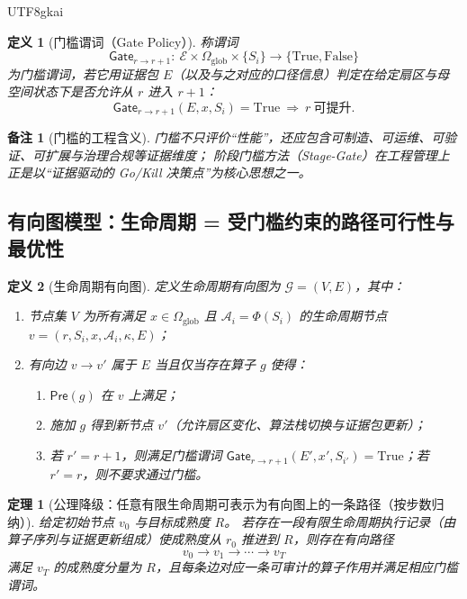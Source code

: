 \documentclass[12pt]{article}
\newtheorem{definition}{定义}[section]
\newtheorem{theorem}{定理}[section]
\newtheorem{remark}{备注}[section]
\begin{document}
\begin{CJK*}{UTF8}{gkai}
\begin{definition}[门槛谓词（Gate Policy）]
称谓词
\[
  \mathsf{Gate}_{r\to r+1}:\ \mathcal{E}\times \Omega_{\mathrm{glob}}\times \{S_i\}\to\{\text{True},\text{False}\}
\]
为门槛谓词，若它用证据包 $E$（以及与之对应的口径信息）判定在给定扇区与母空间状态下是否允许从 $r$ 进入 $r+1$：
\[
  \mathsf{Gate}_{r\to r+1}(E,x,S_i)=\text{True}\ \Rightarrow\ r\ \text{可提升}.
\]
\end{definition}

\begin{remark}[门槛的工程含义]
门槛不只评价“性能”，还应包含可制造、可运维、可验证、可扩展与治理合规等证据维度；
阶段门槛方法（\textsf{Stage-Gate}\cite{ref_stage_gate_dtl}）在工程管理上正是以“证据驱动的 Go/Kill 决策点”为核心思想之一。
\end{remark}

\subsection{有向图模型：生命周期 = 受门槛约束的路径可行性与最优性}
\label{sec:lifecycle-directed-graph}

\begin{definition}[生命周期有向图]
定义生命周期有向图为 $\mathcal{G}=(V,E)$，其中：
\begin{enumerate}
  \item 节点集 $V$ 为所有满足 $x\in\Omega_{\mathrm{glob}}$ 且 $\mathcal{A}_i=\Phi(S_i)$ 的生命周期节点 $v=(r,S_i,x,\mathcal{A}_i,\kappa,
    E)$；
  \item 有向边 $v\to v'$ 属于 $E$ 当且仅当存在算子 $g$ 使得：
  \begin{enumerate}
    \item $\mathsf{Pre}(g)$ 在 $v$ 上满足；
    \item 施加 $g$ 得到新节点 $v'$（允许扇区变化、算法栈切换与证据包更新）；
    \item 若 $r' = r+1$，则满足门槛谓词 $\mathsf{Gate}_{r\to r+1}(E',x',S_{i'})=\text{True}$；若 $r'=r$，则不要求通过门槛。
  \end{enumerate}
\end{enumerate}
\end{definition}

\begin{theorem}[公理降级：任意有限生命周期可表示为有向图上的一条路径（按步数归纳）]
\label{thm:lifecycle-is-a-directed-path}
给定初始节点 $v_0$ 与目标成熟度 $R$。
若存在一段有限生命周期执行记录（由算子序列与证据更新组成）使成熟度从 $r_0$ 推进到 $R$，则存在有向路径
\[
  v_0\to v_1\to\cdots\to v_T
\]
满足 $v_T$ 的成熟度分量为 $R$，且每条边对应一条可审计的算子作用并满足相应门槛谓词。
\end{theorem}


\end{CJK*}
\end{document}
